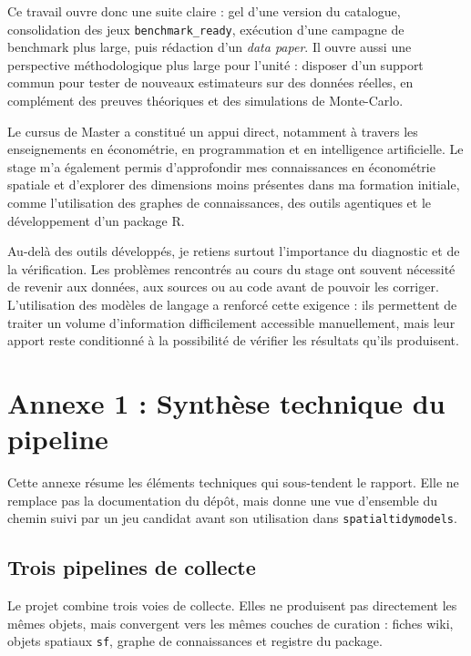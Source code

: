 \documentclass[11pt,a4paper]{article}
\begin{document}
Ce travail ouvre donc une suite claire : gel d'une version du catalogue, consolidation des jeux \texttt{benchmark\_ready}, exécution d'une campagne de benchmark plus large, puis rédaction d'un \textit{data paper}. Il ouvre aussi une perspective méthodologique plus large pour l'unité : disposer d'un support commun pour tester de nouveaux estimateurs sur des données réelles, en complément des preuves théoriques et des simulations de Monte-Carlo.

Le cursus de Master a constitué un appui direct, notamment à travers les enseignements en économétrie, en programmation et en intelligence artificielle. Le stage m'a également permis d'approfondir mes connaissances en économétrie spatiale et d'explorer des dimensions moins présentes dans ma formation initiale, comme l'utilisation des graphes de connaissances, des outils agentiques et le développement d'un package R.

Au-delà des outils développés, je retiens surtout l'importance du diagnostic et de la vérification. Les problèmes rencontrés au cours du stage ont souvent nécessité de revenir aux données, aux sources ou au code avant de pouvoir les corriger. L'utilisation des modèles de langage a renforcé cette exigence : ils permettent de traiter un volume d'information difficilement accessible manuellement, mais leur apport reste conditionné à la possibilité de vérifier les résultats qu'ils produisent.

\clearpage
\appendix

\section{Annexe 1 : Synthèse technique du pipeline}
\label{annexe:pipeline}

Cette annexe résume les éléments techniques qui sous-tendent le rapport. Elle ne remplace pas la documentation du dépôt, mais donne une vue d'ensemble du chemin suivi par un jeu candidat avant son utilisation dans \texttt{spatialtidymodels}.

\subsection{Trois pipelines de collecte}

Le projet combine trois voies de collecte. Elles ne produisent pas directement les mêmes objets, mais convergent vers les mêmes couches de curation : fiches wiki, objets spatiaux \texttt{sf}, graphe de connaissances et registre du package.
\end{document}

